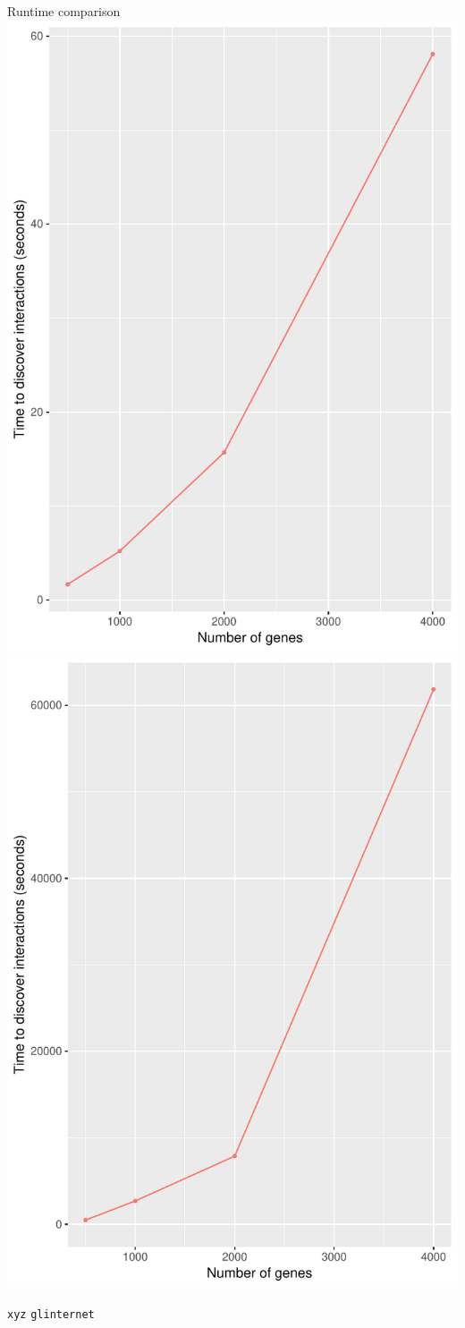 \begin{frame}{Runtime comparison}
\centering
\includegraphics[width=0.45\linewidth]{time_taken/time_taken_xyzTRUE}%
\includegraphics[width=0.45\linewidth]{time_taken/time_taken_xyzFalse}

\hspace{2.8cm} \texttt{xyz} \hfill \texttt{glinternet} \hspace{1.8cm}
\end{frame}


